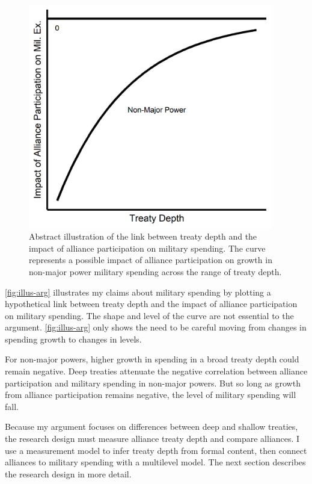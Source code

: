 \documentclass[12pt]{article}
\begin{document}
\begin{figure}[htbp]
	\centering
		\includegraphics[width=0.95\textwidth]{../figures/illus-arg.png}
	\caption{Abstract illustration of the link between treaty depth and the impact of alliance participation on military spending.
	The curve represents a possible impact of alliance participation on growth in non-major power military spending across the range of treaty depth.}
	\label{fig:illus-arg}
\end{figure}


\autoref{fig:illus-arg} illustrates my claims about military spending by plotting a hypothetical link between treaty depth and the impact of alliance participation on military spending. 
The shape and level of the curve are not essential to the argument.
\autoref{fig:illus-arg} only shows the need to be careful moving from changes in spending growth to changes in levels. 


For non-major powers, higher growth in spending in a broad treaty depth could remain negative. 
Deep treaties attenuate the negative correlation between alliance participation and military spending in non-major powers. 
But so long as growth from alliance participation remains negative, the level of military spending will fall. 


Because my argument focuses on differences between deep and shallow treaties, the research design must measure alliance treaty depth and compare alliances.  
I use a measurement model to infer treaty depth from formal content, then connect alliances to military spending with a multilevel model. 
The next section describes the research design in more detail. 
\end{document}
